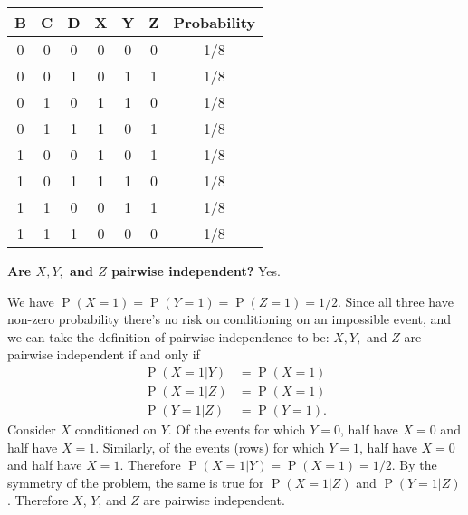 \documentclass{article}
\DeclareMathOperator{\p}{\text{P}}
\begin{document}
\begin{enumerate}[label=(\alph*)]
    \begin{mdframed}

      \begin{tabular}{c|c|c|c|c|c|c}
        B & C & D & X & Y & Z & Probability\\
        \hline
        0 & 0 & 0 & 0 & 0 & 0 & 1/8 \\
        0 & 0 & 1 & 0 & 1 & 1 & 1/8 \\
        0 & 1 & 0 & 1 & 1 & 0 & 1/8 \\
        0 & 1 & 1 & 1 & 0 & 1 & 1/8 \\
        1 & 0 & 0 & 1 & 0 & 1 & 1/8 \\
        1 & 0 & 1 & 1 & 1 & 0 & 1/8 \\
        1 & 1 & 0 & 0 & 1 & 1 & 1/8 \\
        1 & 1 & 1 & 0 & 0 & 0 & 1/8 \\
      \end{tabular}
    \end{mdframed}

    \begin{mdframed}
      \textbf{Are $X, Y,$ and $Z$ pairwise independent?} Yes.

      We have $\p(X=1) = \p(Y=1) = \p(Z=1) = 1/2$. Since all three have
      non-zero probability there's no risk on conditioning on an impossible
      event, and we can take the definition of pairwise independence to be:
      $X, Y,$ and $Z$ are pairwise independent if and only if
      \begin{align*}
        \p(X=1|Y) &= \p(X=1)\\
        \p(X=1|Z) &= \p(X=1)\\
        \p(Y=1|Z) &= \p(Y=1).
      \end{align*}
      Consider $X$ conditioned on $Y$. Of the events for which $Y=0$, half have
      $X=0$ and half have $X=1$. Similarly, of the events (rows) for which
      $Y=1$, half have $X=0$ and half have $X=1$. Therefore
      $\p(X=1|Y) = \p(X=1) = 1/2$. By the symmetry of the problem, the same is
      true for $\p(X=1|Z)$ and $\p(Y=1|Z)$. Therefore $X$, $Y$, and $Z$ are
      pairwise independent.
    \end{mdframed}


\end{enumerate}
\end{document}
